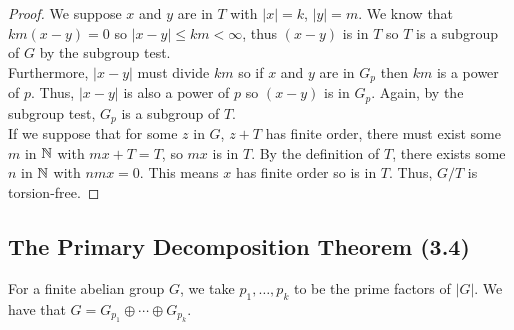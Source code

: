 \begin{proof}
    We suppose $x$ and $y$ are in $T$ with $|x| = k$, $|y| = m$.
    We know that \linebreak $km(x - y) = 0$ so $|x - y| \leq km < \infty$,
    thus $(x - y)$ is in $T$ so $T$ is a subgroup of $G$ by the subgroup test. 
    \\[\baselineskip]
    Furthermore,
    $|x - y|$ must divide $km$ so if $x$ and $y$ are in $G_p$
    then $km$ is a power of $p$. Thus, $|x - y|$ is also a
    power of $p$ so $(x - y)$ is in $G_p$. Again, by the subgroup test,
    $G_p$ is a subgroup of $T$.
    \\[\baselineskip]
    If we suppose that for some $z$ in $G$, $z + T$ has finite order,
    there must exist some $m$ in $\mathbb{N}$ with $mx + T = T$, so 
    $mx$ is in $T$. By the definition of $T$, there exists some $n$
    in $\mathbb{N}$ with $nmx = 0$. This means $x$ has finite order
    so is in $T$. Thus, $G / T$ is torsion-free.
\end{proof}

\subsection{The Primary Decomposition Theorem (3.4)} \label{3.4}

For a finite abelian group $G$, we take $p_1, \ldots, p_k$ to be the
prime factors of $|G|$. We have that $G = G_{p_1} \oplus \cdots \oplus
G_{p_k}$.


